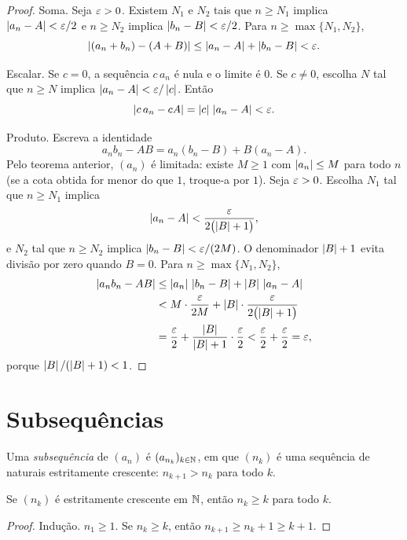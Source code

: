\documentclass[11pt,a4paper]{article}
\begin{document}
\begin{proof}
Soma. Seja \(\varepsilon>0\). Existem \(N_1\) e \(N_2\) tais que \(n\ge N_1\) implica \(\left\lvert a_n-A \right\rvert<\varepsilon/2\) e \(n\ge N_2\) implica \(\left\lvert b_n-B \right\rvert<\varepsilon/2\). Para \(n\ge\max\{N_1,N_2\}\),
\[
\left\lvert (a_n+b_n)-(A+B) \right\rvert
\le\left\lvert a_n-A \right\rvert+\left\lvert b_n-B \right\rvert
<\varepsilon.
\]

Escalar. Se \(c=0\), a sequência \(c\,a_n\) é nula e o limite é \(0\). Se \(c\neq 0\), escolha \(N\) tal que \(n\ge N\) implica \(\left\lvert a_n-A \right\rvert<\varepsilon/\left\lvert c \right\rvert\). Então
\[
\left\lvert c\,a_n-cA \right\rvert=\left\lvert c \right\rvert\,\left\lvert a_n-A \right\rvert<\varepsilon.
\]

Produto. Escreva a identidade
\[
a_nb_n-AB=a_n(b_n-B)+B(a_n-A).
\]
Pelo teorema anterior, \((a_n)\) é limitada: existe \(M\ge 1\) com \(\left\lvert a_n \right\rvert\le M\) para todo \(n\) (se a cota obtida for menor do que \(1\), troque-a por \(1\)). Seja \(\varepsilon>0\). Escolha \(N_1\) tal que \(n\ge N_1\) implica
\[
\left\lvert a_n-A \right\rvert<\frac{\varepsilon}{2\bigl(\left\lvert B \right\rvert+1\bigr)},
\]
e \(N_2\) tal que \(n\ge N_2\) implica \(\left\lvert b_n-B \right\rvert<\varepsilon/(2M)\). O denominador \(\left\lvert B \right\rvert+1\) evita divisão por zero quando \(B=0\). Para \(n\ge\max\{N_1,N_2\}\),
\begin{align*}
\left\lvert a_nb_n-AB \right\rvert
&\le\left\lvert a_n \right\rvert\,\left\lvert b_n-B \right\rvert+\left\lvert B \right\rvert\,\left\lvert a_n-A \right\rvert\\
&< M\cdot\frac{\varepsilon}{2M}+\left\lvert B \right\rvert\cdot\frac{\varepsilon}{2\bigl(\left\lvert B \right\rvert+1\bigr)}\\
&=\frac{\varepsilon}{2}+\frac{\left\lvert B \right\rvert}{\left\lvert B \right\rvert+1}\cdot\frac{\varepsilon}{2}
<\frac{\varepsilon}{2}+\frac{\varepsilon}{2}
=\varepsilon,
\end{align*}
porque \(\left\lvert B \right\rvert/(\left\lvert B \right\rvert+1)<1\).
\end{proof}

\section{Subsequências}

\begin{definicao}
Uma \emph{subsequência} de \((a_n)\) é \((a_{n_k})_{k\in\mathbb{N}}\), em que \((n_k)\) é uma sequência de naturais estritamente crescente: \(n_{k+1}>n_k\) para todo \(k\).
\end{definicao}

\begin{lema}
Se \((n_k)\) é estritamente crescente em \(\mathbb{N}\), então \(n_k\ge k\) para todo \(k\).
\end{lema}

\begin{proof}
Indução. \(n_1\ge 1\). Se \(n_k\ge k\), então \(n_{k+1}\ge n_k+1\ge k+1\).
\end{proof}
\end{document}
